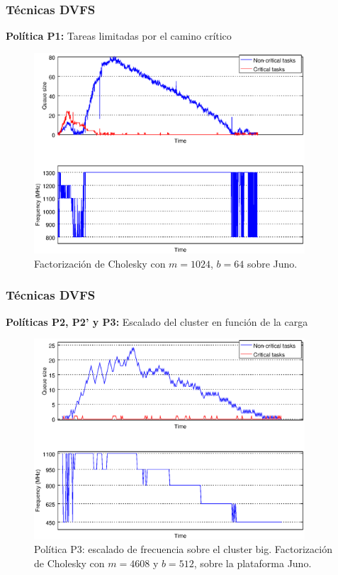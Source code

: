 \documentclass[10pt]{beamer}
\begin{document}
\begin{frame}
  \frametitle{Técnicas DVFS}
  {\bf Política P1:} Tareas limitadas por el camino crítico
  \vfill
  \vspace{-0.8cm}
  \begin{figure}
    \centering
    \includegraphics[width=0.9\textwidth]{Plots/politicas/P1_1024-64_juno.eps}
    \vspace{-0.8cm}
    \caption{Factorización de Cholesky con $m=1024$, $b=64$ sobre {\sc Juno}.}
  \end{figure}
  \vspace{-1cm}
\end{frame}

\begin{frame}
  \frametitle{Técnicas DVFS}
  {\bf Políticas P2, P2' y P3:} Escalado del cluster en función de la carga
  \vfill
  \vspace{-0.8cm}
  \begin{figure}
    \centering
    \includegraphics[width=0.9\textwidth]{Plots/politicas/P3_4608-512.eps}
    \vspace{-0.8cm}
    \caption{Política P3: escalado de frecuencia sobre el cluster
      big. Factorización de Cholesky con $m=4608$ y $b=512$, sobre la
      plataforma {\sc Juno}.}
  \end{figure}
\end{frame}
\end{document}
